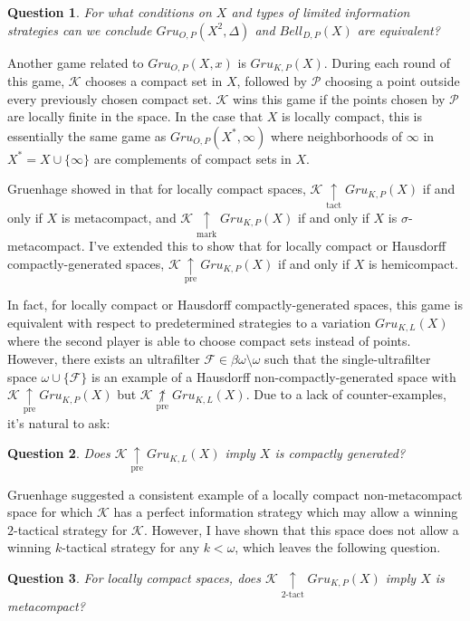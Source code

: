 \documentclass[11pt]{amsart}
\theoremstyle{plain}
\newtheorem{question}{Question}
\newcommand{\prewin}{\underset{\text{pre}}{\uparrow}}
\newcommand{\markwin}{\underset{\text{mark}}{\uparrow}}
\newcommand{\tactwin}{\underset{\text{tact}}{\uparrow}}
\newcommand{\ktactwin}[1]{\underset{#1\text{-tact}}{\uparrow}}
\newcommand{\notprewin}{\underset{\text{pre}}{\not\uparrow}}
\newcommand{\oneptcomp}[1]{#1^*}
\newcommand{\gruConGame}[2]{Gru_{O,P}(#1,#2)}
\newcommand{\gruKPGame}[1]{Gru_{K,P}(#1)}
\newcommand{\gruKLGame}[1]{Gru_{K,L}(#1)}
\newcommand{\bellConGame}[1]{Bell_{D,P}(#1)}
\newcommand{\<}{\langle}
\renewcommand{\>}{\rangle}
\newcommand{\mc}[1]{\mathcal{#1}}
\newcommand{\pl}[1]{\mathscr{#1}}
\begin{document}
\begin{question}
  For what conditions on $X$ and types of limited information strategies
  can we conclude $\gruConGame{X^2}{\Delta}$ and $\bellConGame{X}$ are
  equivalent?
\end{question}

Another game related to $\gruConGame{X}{x}$ is $\gruKPGame{X}$. During each
round of this game, $\pl K$ chooses a compact set in $X$, followed by
$\pl P$ choosing a point outside every previously chosen compact set. $\pl K$
wins this game if the points chosen by $\pl P$ are locally finite in the
space. In the case that $X$ is locally compact, this is essentially the
same game as $\gruConGame{\oneptcomp X}{\infty}$ where neighborhoods of
$\infty$ in $\oneptcomp X=X\cup\{\infty\}$ are complements of compact sets
in $X$.

Gruenhage showed in \cite{MR858337} that for locally compact spaces,
$\pl K\tactwin\gruKPGame{X}$ if and
only if $X$ is metacompact, and $\pl K\markwin\gruKPGame{X}$ if and only if
$X$ is $\sigma$-metacompact. I've extended this to show that for locally
compact or Hausdorff compactly-generated spaces,
$\pl K\prewin\gruKPGame{X}$ if and only if $X$ is hemicompact.

In fact, for
locally compact or Hausdorff compactly-generated spaces, this game is
equivalent with respect to predetermined strategies to a variation
$\gruKLGame{X}$ where the second player is able to choose compact sets
instead of points. However, there exists an ultrafilter
$\mc F\in\beta\omega\setminus\omega$ such that the single-ultrafilter space
$\omega\cup\{\mc F\}$
is an example of a Hausdorff non-compactly-generated space with
$\pl K\prewin\gruKPGame{X}$ but $\pl K\notprewin\gruKLGame{X}$. Due to a lack
of counter-examples, it's natural to ask:

\begin{question}
  Does $\pl K\prewin\gruKLGame{X}$ imply $X$ is compactly generated?
\end{question}

Gruenhage suggested a consistent example of a locally compact non-metacompact
space for which $\pl K$ has a perfect information strategy which may allow
a winning $2$-tactical strategy for $\pl K$. However, I have shown that this
space does not allow a winning $k$-tactical strategy for any $k<\omega$, which
leaves the following question.

\begin{question}
  For locally compact spaces,
  does $\pl K\ktactwin{2}\gruKPGame{X}$ imply
  $X$ is metacompact?
\end{question}
\end{document}
